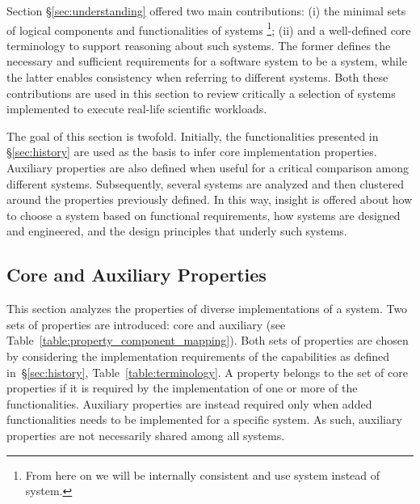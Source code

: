 \documentclass{sig-alternate}
\begin{document}
Section \S\ref{sec:understanding} offered two main contributions: (i) the
minimal sets of logical components and functionalities of \pilot systems
\footnote{From here on we will be internally consistent and use \pilot system
instead of \pilotjob system.}; (ii) and a well-defined core terminology to
support reasoning about such systems. The former defines the necessary and
sufficient requirements for a software system to be a \pilot system, while the
latter enables consistency when referring to different \pilot systems. Both
these contributions are used in this section to review critically a selection of
\pilot systems implemented to execute real-life scientific workloads.

The goal of this section is twofold. Initially, the \pilot functionalities
presented in \S\ref{sec:history} are used as the basis to infer core \pilot
implementation properties. Auxiliary properties are also defined when useful
for a critical comparison among different \pilot systems. Subsequently, several
\pilot systems are analyzed and then clustered around the properties previously
defined. In this way, insight is offered about how to choose a \pilot system
based on functional requirements, how \pilot systems are designed and
engineered, and the design principles that underly such systems.


%
\subsection{Core and Auxiliary Properties}
\label{sec:properties}

This section analyzes the properties of diverse implementations of a \pilot
system. Two sets of properties are introduced: core and auxiliary (see
Table~\ref{table:property_component_mapping}). Both sets of properties are
chosen by considering the implementation requirements of the \pilot capabilities
as defined in~\S\ref{sec:history}, Table~\ref{table:terminology}.  A property
belongs to the set of core properties if it is required by the implementation of
one or more of the \pilot functionalities. Auxiliary properties are instead
required only when added functionalities needs to be implemented for a specific
\pilot system. As such, auxiliary properties are not necessarily shared among
all \pilot systems.
\end{document}
